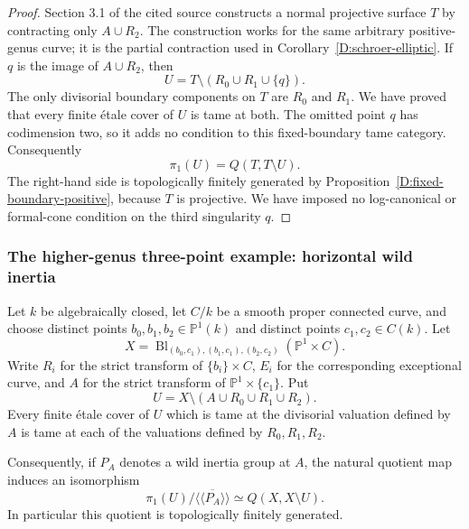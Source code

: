\begin{proof}
Section 3.1 of the cited source constructs a normal projective
surface $T$ by contracting only $A\cup R_2$.  The construction
works for the same arbitrary positive-genus curve; it is the
partial contraction used in Corollary~\ref{D:schroer-elliptic}.
If $q$ is the image of $A\cup R_2$, then
\[
                   U=T\setminus(R_0\cup R_1\cup\{q\}).
\]
The only divisorial boundary components on $T$ are $R_0$ and
$R_1$.  We have proved that every finite \'etale cover of $U$
is tame at both.  The omitted point $q$ has codimension two,
so it adds no condition to this fixed-boundary tame category.
Consequently
\[
                   \pi_1(U)=Q(T,T\setminus U).
\]
The right-hand side is topologically finitely generated by
Proposition~\ref{D:fixed-boundary-positive}, because $T$ is
projective.  We have imposed no log-canonical or formal-cone
condition on the third singularity $q$.
\end{proof}


\subsubsection{The higher-genus three-point example: horizontal wild inertia}

\begin{proposition}
\label{D:Schroer-horizontal-tame}
Let $k$ be algebraically closed, let $C/k$ be a smooth proper
connected curve, and choose distinct points $b_0,b_1,b_2\in\mathbb P^1(k)$
and distinct points $c_1,c_2\in C(k)$.  Let
\[
 X=\operatorname{Bl}_{(b_0,c_1),(b_1,c_1),(b_2,c_2)}
       (\mathbb P^1\times C).
\]
Write $R_i$ for the strict transform of $\{b_i\}\times C$, $E_i$
for the corresponding exceptional curve, and $A$ for the strict
transform of $\mathbb P^1\times\{c_1\}$.  Put
\[
 U=X\setminus(A\cup R_0\cup R_1\cup R_2).
\]
Every finite \'etale cover of $U$ which is tame at the divisorial
valuation defined by $A$ is tame at each of the valuations defined
by $R_0,R_1,R_2$.

Consequently, if $P_A$ denotes a wild inertia group at $A$, the
natural quotient map induces an isomorphism
\[
 \pi_1(U)/\overline{\langle\!\langle P_A\rangle\!\rangle}
 \simeq Q(X,X\setminus U).
\]
In particular this quotient is topologically finitely generated.
\end{proposition}

